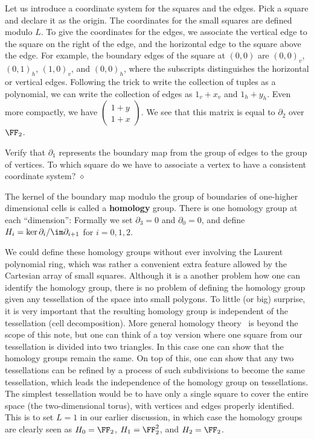Let us introduce a coordinate system for the squares and the edges.
Pick a square and declare it as the origin.
The coordinates for the small squares are defined modulo $L$.
To give the coordinates for the edges, 
we associate the vertical edge to the square on the right of the edge,
and the horizontal edge to the square above the edge.
For example, 
the boundary edges of the square at $(0,0)$ are $(0,0)_v$, $(0,1)_h$,
$(1,0)_v$, and $(0,0)_h$,
where the subscripts distinguishes the horizontal or vertical edges.
Following the trick to write the collection of tuples as a polynomial,
we can write the collection of edges as $1_v + x_v$ and $1_h + y_h$.
Even more compactly, we have $\begin{pmatrix} 1+y \\ 1+x \end{pmatrix}$.
We see that this matrix is equal to $\partial_2$ over $\FF_2$.

\begin{exc}
Verify that $\partial_1$ represents the boundary map from the group of edges to the group of vertices.
To which square do we have to associate a vertex to have a consistent coordinate system?
\hfill $\diamond$ \end{exc}

The kernel of the boundary map modulo the group of boundaries of one-higher dimensional cells
is called a {\bf homology} group.
There is one homology group at each ``dimension'':
Formally we set $\partial_3 = 0$ and $\partial_0 = 0$,
and define $H_i = \ker \partial_i / \im \partial_{i+1}$ for $i=0,1,2$.

We could define these homology groups without ever involving the Laurent polynomial ring,
which was rather a convenient extra feature allowed by the Cartesian array of small squares.
Although it is a another problem how one can identify the homology group,
there is no problem of defining the homology group given any tessellation of the space
into small polygons.
To little (or big) surprise,
it is very important that the resulting homology group is independent of the tessellation 
(cell decomposition).
More general homology theory~\cite{Hatcher2002book}
is beyond the scope of this note,
but one can think of a toy version where one square from our tessellation is divided into two triangles.
In this case one can show that the homology groups remain the same.
On top of this, one can show that any two tessellations can be refined by a process of such subdivisions
to become the same tessellation, which leads the independence of the homology group on tessellations.
The simplest tessellation would be to have only a single square to cover the entire space (the two-dimensional torus),
with vertices and edges properly identified.
This is to set $L=1$ in our earlier discussion,
in which case the homology groups are clearly seen as $H_0 = \FF_2$, $H_1 = \FF_2^2$, and $H_2 = \FF_2$.

